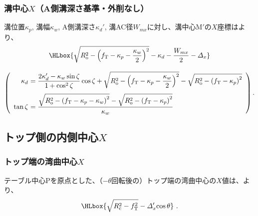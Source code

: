 \subsubsection{溝中心\texorpdfstring{$X$}{X}（A側溝深さ基準・外削なし）}
溝位置$\kappa_p$, 溝幅$\kappa_w$, A側溝深さ$\kappa_d'$, 溝AC径$W_{mx}$に対し、溝中心M$'$の$X$座標はより、
\begin{gather*}
  \HLbox{%
    \sqrt{R_\mathrm o^2-\left(f_\mathrm T-\kappa_p-\frac{\kappa_w}2\right)^2}
    -\kappa_d
    -\frac{W_{mx}}2
    -\varDelta_x%
  }\\[9pt]
  \left(
  \begin{array}{rl}
  \kappa_d\!\!\!\!
  &= \displaystyle
     \frac{2\kappa_d'-\kappa_w\sin\zeta}{1+\cos^2\zeta}\cos\zeta
     +\sqrt{R_\mathrm o^2-\left(f_\mathrm T-\kappa_p-\frac{\kappa_w}2\right)^2}
     -\sqrt{R_\mathrm o^2-\left(f_\mathrm T-\kappa_p\right)^2}\\[12pt]
  \tan\zeta\!\!\!\!
  &= \displaystyle
     \frac{\sqrt{R_\mathrm o^2-\left(f_\mathrm T-\kappa_p-\kappa_w\right)^2}
           -\sqrt{R_\mathrm o^2-\left(f_\mathrm T-\kappa_p\right)^2}}
          {\kappa_w}
  \end{array}
  \right).
\end{gather*}


\clearpage
\subsection{トップ側の内側中心\texorpdfstring{$X$}{X}}

\subsubsection{トップ端の湾曲中心\texorpdfstring{$X$}{X}}
テーブル中心Pを原点とした、（$-\theta$回転後の）トップ端の湾曲中心の$X$値は、より、
\begin{align*}
  \HLbox{\sqrt{R_\mathrm c^2-f_\mathrm T^2}-\varDelta_x'\!\cos\theta}~.
\end{align*}

